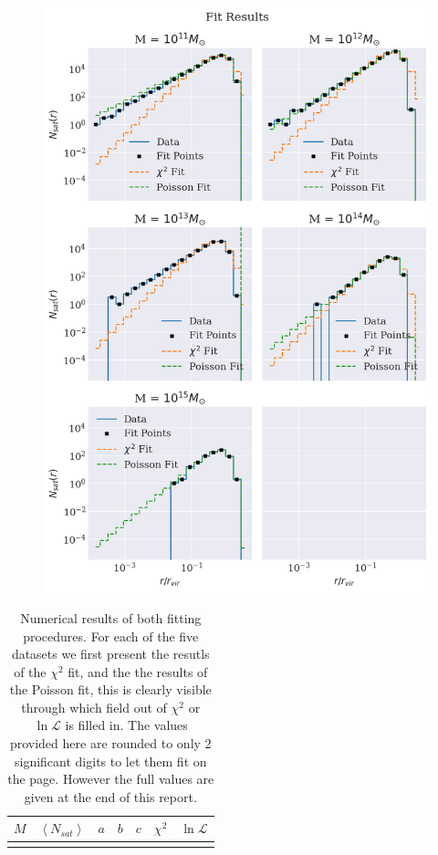 \begin{figure}
    \centering
    \includegraphics[width=\textwidth]{results/fitresults.png}
    \caption{}
    \label{fig:fitres}
\end{figure}

\begin{table}[h]
    \centering
    \begin{tabular}{|c|c|c|c|c|c|c|}
    \hline
    $M$ & $\left<N_{sat}\right>$ & $a$ & $b$ & $c$ & $\chi^2$ & $\ln\mathcal{L}$   \\
    \hline
     \\
    \hline
    \end{tabular}
    
    \caption{Numerical results of both fitting procedures. For each of the five datasets we first present the resutls of the $\chi^2$ fit, and the the results of the Poisson fit, this is clearly visible through which field out of $\chi^2$ or $\ln\mathcal{L}$ is filled in. The values provided here are rounded to only 2 significant digits to let them fit on the page. However the full values are given at the end of this report.}
    \label{tab:fit_vals}
\end{table}

